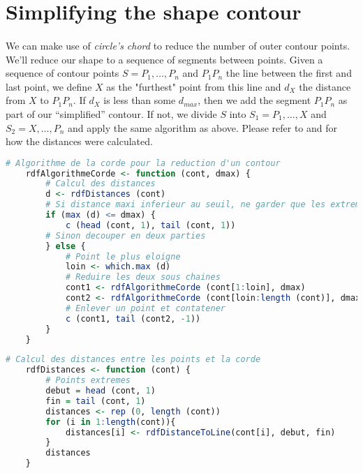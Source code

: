 \section{Simplifying the shape contour}
\paragraph{}
We can make use of \emph{circle's chord} to reduce the number of outer contour points. We'll reduce our shape to a sequence of segments between points.
Given a sequence of contour points $S = P_1, \dots, P_n$ and $P_1P_n$ the line between the first and last point, we define $X$ as the "furthest" point from this line and $d_X$ the distance from $X$ to $P_1P_n$.
If $d_X$ is less than some $d_{max}$, then we add the segment $P_1P_n$ as part of our ``simplified'' contour.
If not, we divide $S$ into $S_1 = P_1, \dots, X$ and $S_2 = X, \dots, P_n$ and apply the same algorithm as above.
Please refer to \cite{point_to_line_distance} and \cite{line_equation_complex_numbers} for how the distances were calculated.

\begin{lstlisting}[language=R, caption=Chord algorithm]
    # Algorithme de la corde pour la reduction d'un contour
    rdfAlgorithmeCorde <- function (cont, dmax) {
        # Calcul des distances
        d <- rdfDistances (cont)
        # Si distance maxi inferieur au seuil, ne garder que les extremites
        if (max (d) <= dmax) {
            c (head (cont, 1), tail (cont, 1))
        # Sinon decouper en deux parties
        } else {
            # Point le plus eloigne
            loin <- which.max (d)
            # Reduire les deux sous chaines
            cont1 <- rdfAlgorithmeCorde (cont[1:loin], dmax)
            cont2 <- rdfAlgorithmeCorde (cont[loin:length (cont)], dmax)
            # Enlever un point et contatener
            c (cont1, tail (cont2, -1))
        }
    }
\end{lstlisting}

\begin{lstlisting}[language=R, caption=Calculating distances from $P_1P_n$ to each point]
    # Calcul des distances entre les points et la corde
    rdfDistances <- function (cont) {
        # Points extremes
        debut = head (cont, 1)
        fin = tail (cont, 1)
        distances <- rep (0, length (cont))
        for (i in 1:length(cont)){
            distances[i] <- rdfDistanceToLine(cont[i], debut, fin)
        }
        distances
    }
\end{lstlisting}

